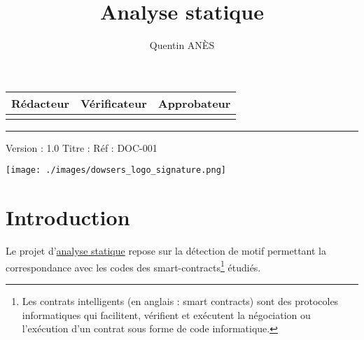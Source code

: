 \documentclass[10pt,a4paper]{article}
\begin{document}
\begin{titlepage}
\newcommand{\doctitle}{\blockchain}

\centering
\vspace*{4cm}
{\huge \textbf{\doctitle}}\vfill

\vspace*{12cm}
\begin{tabular}{|c|c|c|}
\hline
\textbf{Rédacteur} & \textbf{Vérificateur} & \textbf{Approbateur} \\
\hline
& & \\
\hline
\end{tabular}

\vspace{0.5cm}
\noindent\rule{10cm}{0.4pt}
\vspace{1cm}
\begin{flushright}
\begin{center}
Version : 1.0 \hspace{1cm} Titre : \doctitle \hspace{1cm} Réf : DOC-001
\end{center}
\end{flushright}

\end{titlepage}

\newpage
\author{Quentin ANÈS}
\title{Analyse statique}


\pagestyle{fancy}


\fancyhead[L]{}
\fancyhead[R]{}

\renewcommand{\footrulewidth}{1pt}
\fancyfoot[R]{\today}

\begin{center}
\texttt{[image: ./images/dowsers\_logo\_signature.png]}
\end{center}

\section{Introduction}
Le projet d'\href{https://fr.wikipedia.org/wiki/Analyse_statique_de_programmes}{analyse statique} repose sur la détection de motif permettant la correspondance avec les codes des smart-contracts\footnote{Les contrats intelligents (en anglais : smart contracts) sont des protocoles informatiques qui facilitent, vérifient et exécutent la négociation ou l'exécution d'un contrat sous forme de code informatique.} étudiés.
\end{document}

